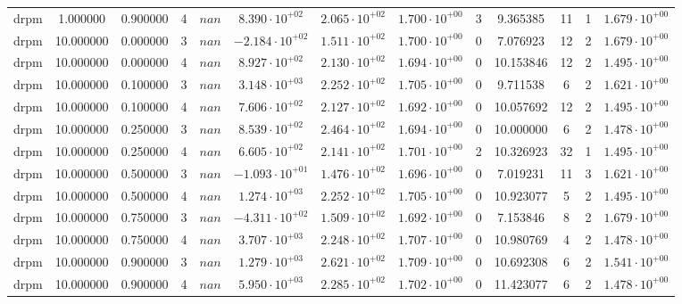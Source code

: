 \begin{table}
\begin{tabular}{ccccccccccccc}
drpm & 1.000000 & 0.900000 & 4 & $nan$ & $8.390 \cdot 10^{+02}$ & $2.065 \cdot 10^{+02}$ & $1.700 \cdot 10^{+00}$ & 3 & 9.365385 & 11 & 1 & $1.679 \cdot 10^{+00}$ \\
drpm & 10.000000 & 0.000000 & 3 & $nan$ & $-2.184 \cdot 10^{+02}$ & $1.511 \cdot 10^{+02}$ & $1.700 \cdot 10^{+00}$ & 0 & 7.076923 & 12 & 2 & $1.679 \cdot 10^{+00}$ \\
drpm & 10.000000 & 0.000000 & 4 & $nan$ & $8.927 \cdot 10^{+02}$ & $2.130 \cdot 10^{+02}$ & $1.694 \cdot 10^{+00}$ & 0 & 10.153846 & 12 & 2 & $1.495 \cdot 10^{+00}$ \\
drpm & 10.000000 & 0.100000 & 3 & $nan$ & $3.148 \cdot 10^{+03}$ & $2.252 \cdot 10^{+02}$ & $1.705 \cdot 10^{+00}$ & 0 & 9.711538 & 6 & 2 & $1.621 \cdot 10^{+00}$ \\
drpm & 10.000000 & 0.100000 & 4 & $nan$ & $7.606 \cdot 10^{+02}$ & $2.127 \cdot 10^{+02}$ & $1.692 \cdot 10^{+00}$ & 0 & 10.057692 & 12 & 2 & $1.495 \cdot 10^{+00}$ \\
drpm & 10.000000 & 0.250000 & 3 & $nan$ & $8.539 \cdot 10^{+02}$ & $2.464 \cdot 10^{+02}$ & $1.694 \cdot 10^{+00}$ & 0 & 10.000000 & 6 & 2 & $1.478 \cdot 10^{+00}$ \\
drpm & 10.000000 & 0.250000 & 4 & $nan$ & $6.605 \cdot 10^{+02}$ & $2.141 \cdot 10^{+02}$ & $1.701 \cdot 10^{+00}$ & 2 & 10.326923 & 32 & 1 & $1.495 \cdot 10^{+00}$ \\
drpm & 10.000000 & 0.500000 & 3 & $nan$ & $-1.093 \cdot 10^{+01}$ & $1.476 \cdot 10^{+02}$ & $1.696 \cdot 10^{+00}$ & 0 & 7.019231 & 11 & 3 & $1.621 \cdot 10^{+00}$ \\
drpm & 10.000000 & 0.500000 & 4 & $nan$ & $1.274 \cdot 10^{+03}$ & $2.252 \cdot 10^{+02}$ & $1.705 \cdot 10^{+00}$ & 0 & 10.923077 & 5 & 2 & $1.495 \cdot 10^{+00}$ \\
drpm & 10.000000 & 0.750000 & 3 & $nan$ & $-4.311 \cdot 10^{+02}$ & $1.509 \cdot 10^{+02}$ & $1.692 \cdot 10^{+00}$ & 0 & 7.153846 & 8 & 2 & $1.679 \cdot 10^{+00}$ \\
drpm & 10.000000 & 0.750000 & 4 & $nan$ & $3.707 \cdot 10^{+03}$ & $2.248 \cdot 10^{+02}$ & $1.707 \cdot 10^{+00}$ & 0 & 10.980769 & 4 & 2 & $1.478 \cdot 10^{+00}$ \\
drpm & 10.000000 & 0.900000 & 3 & $nan$ & $1.279 \cdot 10^{+03}$ & $2.621 \cdot 10^{+02}$ & $1.709 \cdot 10^{+00}$ & 0 & 10.692308 & 6 & 2 & $1.541 \cdot 10^{+00}$ \\
drpm & 10.000000 & 0.900000 & 4 & $nan$ & $5.950 \cdot 10^{+03}$ & $2.285 \cdot 10^{+02}$ & $1.702 \cdot 10^{+00}$ & 0 & 11.423077 & 6 & 2 & $1.478 \cdot 10^{+00}$ \\

\end{tabular}
\end{table}
